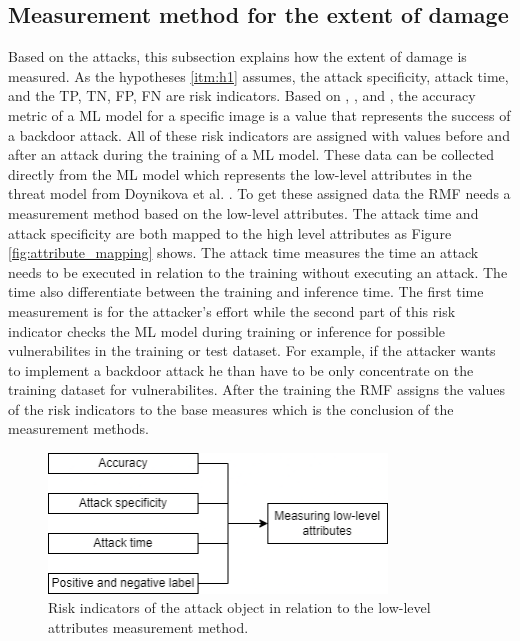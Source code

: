 \subsection{Measurement method for the extent of damage}
\label{sec:ext_dmg}

Based on the attacks, this subsection explains how the extent of damage is measured. As the hypotheses \ref{itm:h1} assumes, the attack specificity, attack time, and the TP, TN, FP, FN are risk indicators. Based on \cite{DBLP:journals/corr/abs-1708-06733}, \cite{turner2018clean}, and \cite{DBLP:journals/corr/abs-1910-00033}, the accuracy metric of a ML model for a specific image is a value that represents the success of a backdoor attack. All of these risk indicators are assigned with values before and after an attack during the training of a ML
model. These data can be collected directly from the ML model which represents the low-level attributes in the threat model from Doynikova et al. \cite{DBLP:conf/crisis/DoynikovaNGK20}. To get these assigned data the RMF needs a measurement method based on the low-level attributes. The attack time and attack specificity are both mapped to the high level attributes as Figure \ref{fig:attribute_mapping} shows. The attack time measures the time an attack needs to be executed in relation to the training without executing an attack. The time also differentiate between the training and inference time. The first time measurement is for the attacker's effort while the second part of this risk indicator checks the ML model during training or inference for possible vulnerabilites \cite{DBLP:journals/csur/RosenbergSER21} in the training or test dataset. For example, if the attacker wants to implement a backdoor attack he than have to be only concentrate on the training dataset for vulnerabilites. After the training the RMF assigns the values of the risk indicators to the base measures which is the conclusion of the measurement methods.

\begin{figure}[ht!]
  \centering
  \includegraphics[width=9cm]{pictures/measure_damage.png}
  \caption{Risk indicators of the attack object in relation to the low-level attributes measurement method.}
  \label{fig:measure_damage}
\end{figure}

